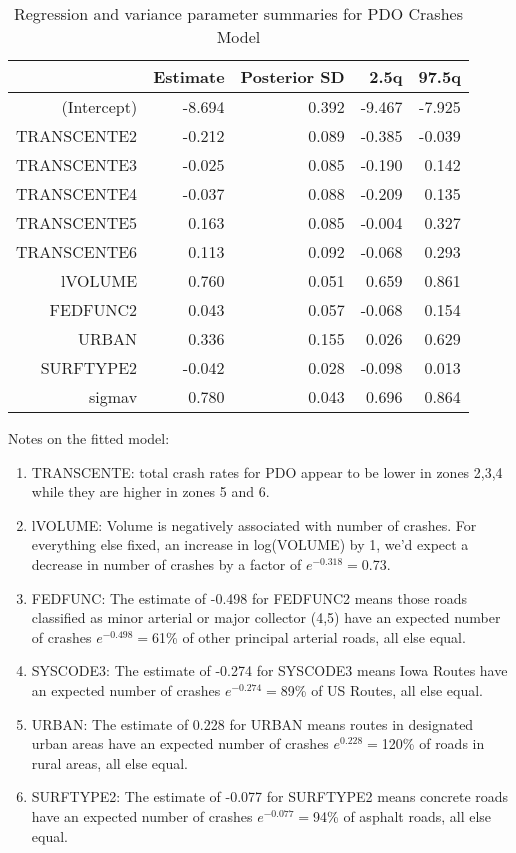 \documentclass[a4paper]{article}\usepackage[]{graphicx}\usepackage[]{color}
\begin{document}
\begin{table}[ht]
\centering
\begin{tabular}{rrrrr}
  \hline
 & Estimate & Posterior SD & 2.5q & 97.5q \\ 
  \hline
(Intercept) & -8.694 & 0.392 & -9.467 & -7.925 \\ 
  TRANSCENTE2 & -0.212 & 0.089 & -0.385 & -0.039 \\ 
  TRANSCENTE3 & -0.025 & 0.085 & -0.190 & 0.142 \\ 
  TRANSCENTE4 & -0.037 & 0.088 & -0.209 & 0.135 \\ 
  TRANSCENTE5 & 0.163 & 0.085 & -0.004 & 0.327 \\ 
  TRANSCENTE6 & 0.113 & 0.092 & -0.068 & 0.293 \\ 
  lVOLUME & 0.760 & 0.051 & 0.659 & 0.861 \\ 
  FEDFUNC2 & 0.043 & 0.057 & -0.068 & 0.154 \\ 
  URBAN & 0.336 & 0.155 & 0.026 & 0.629 \\ 
  SURFTYPE2 & -0.042 & 0.028 & -0.098 & 0.013 \\ 
  sigmav & 0.780 & 0.043 & 0.696 & 0.864 \\ 
   \hline
\end{tabular}
\caption{Regression and variance parameter summaries for PDO Crashes Model} 
\label{pdocrash}
\end{table}


Notes on the fitted model:

\begin{enumerate}
\item
TRANSCENTE: total crash rates for PDO appear to be lower in zones 2,3,4 while they are higher in zones 5 and 6. 

\item
lVOLUME: Volume is negatively associated with number of crashes. For everything else fixed, an increase in log(VOLUME) by 1, we'd expect a decrease in number of crashes by a factor of $e^{-0.318}=$0.73.

\item
FEDFUNC: The estimate of -0.498 for FEDFUNC2 means those roads classified as minor arterial or major collector (4,5) have an expected number of crashes $e^{-0.498}=$61\% of other principal arterial roads, all else equal. 

\item
SYSCODE3: The estimate of -0.274 for SYSCODE3 means Iowa Routes have an expected number of crashes $e^{-0.274}=$89\% of US Routes, all else equal.

\item
URBAN: The estimate of 0.228 for URBAN means routes in designated urban areas have an expected number of crashes $e^{0.228}=$120\% of roads in rural areas, all else equal.

\item
SURFTYPE2: The estimate of -0.077 for SURFTYPE2 means concrete roads have an expected number of crashes $e^{-0.077}=$94\% of asphalt roads, all else equal.

\end{enumerate}
\end{document}

